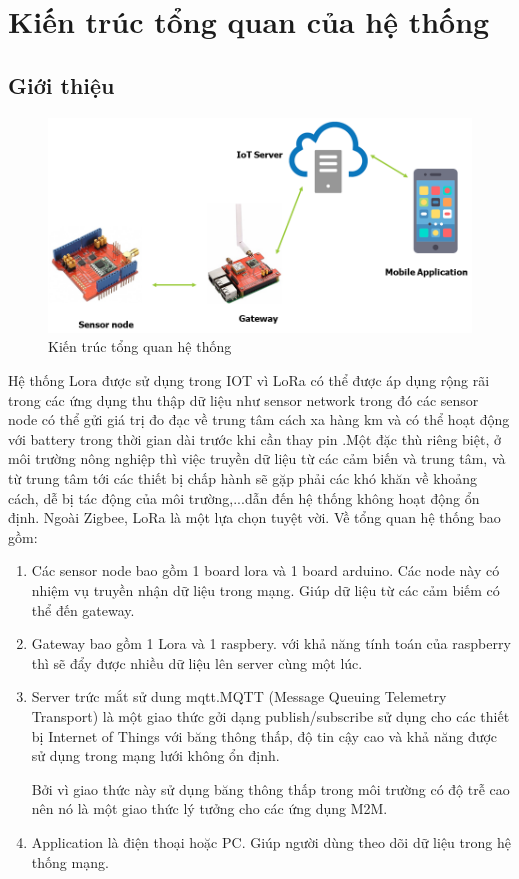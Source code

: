 \chapter{Kiến trúc tổng quan của hệ thống}
\section{Giới thiệu}
\begin{figure}[ht]
\begin{center}
\includegraphics[scale=0.6]{image2/gioi-thieu-chuong-2.png}
\end{center}
\caption{Kiến trúc tổng quan hệ thống}
\end{figure}
Hệ thống Lora được sử dụng trong IOT vì LoRa có thể được áp dụng rộng rãi trong các ứng dụng thu thập dữ liệu như sensor network trong đó các sensor node có thể gửi giá trị đo đạc về trung tâm cách xa hàng km và có thể hoạt động với battery trong thời gian dài trước khi cần thay pin .Một đặc thù riêng biệt, ở môi trường nông nghiệp thì việc truyền dữ liệu từ các cảm biến và trung tâm, và từ trung tâm tới các thiết bị chấp hành sẽ gặp phải các khó khăn về khoảng cách, dễ bị tác động của môi trường,...dẫn đến hệ thống không hoạt động ổn định. Ngoài Zigbee, LoRa là một lựa chọn tuyệt vời. 
Về tổng quan hệ thống bao gồm:
\begin{enumerate}
    \item Các sensor node bao gồm 1 board lora và 1 board arduino. Các node này có nhiệm vụ truyền nhận dữ liệu trong mạng. Giúp dữ liệu từ các cảm biếm có thể đến gateway.
    \item Gateway bao gồm 1 Lora và 1 raspbery. với khả năng tính toán của raspberry thì sẽ đẩy được nhiều dữ liệu lên server cùng một lúc.
    \item Server trức mắt sử dung mqtt.MQTT (Message Queuing Telemetry Transport) là một giao thức gởi dạng publish/subscribe sử dụng cho các thiết bị Internet of Things với băng thông thấp, độ tin cậy cao và khả năng được sử dụng trong mạng lưới không ổn định.

    Bởi vì giao thức này sử dụng băng thông thấp trong môi trường có độ trễ cao nên nó là một giao thức lý tưởng cho các ứng dụng M2M.
    
    \item Application là điện thoại hoặc PC. Giúp người dùng theo dõi dữ liệu trong hệ thống mạng.
\end{enumerate}


